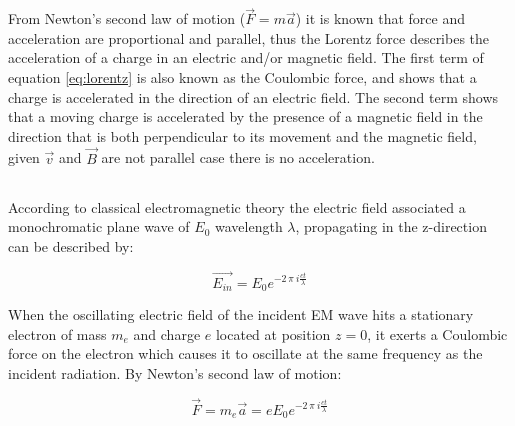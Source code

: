 \DIFaddbegin {}\DIFaddend From Newton's second law of motion
($\vec{F} = m \vec{a}$) it is known that force and acceleration are
proportional and parallel, thus the Lorentz force describes the
acceleration of a charge in an electric and/or magnetic field. The
first term of equation \ref{eq:lorentz} is also known as the Coulombic
force, and shows that a charge is accelerated in the direction of an
electric field. The second term shows that a moving charge is
accelerated by the presence of a magnetic field in the direction that
is both perpendicular to its movement and the magnetic field, given
\DIFaddbegin {}\DIFaddend $\vec{v}$ and $\vec{B}$ are not parallel \DIFdelbegin {}\DIFdelend \DIFaddbegin {}\DIFaddend case there is
no acceleration\DIFdelbegin \DIFdel{)}\DIFdelend .

\DIFaddbegin \subsection{}
\DIFaddend According to classical electromagnetic theory the electric field
associated \DIFdelbegin {}\DIFdelend \DIFaddbegin {}\DIFaddend a monochromatic plane wave of \DIFdelbegin {}\DIFdelend \DIFaddbegin {}\DIFaddend $E_0$ \DIFdelbegin \DIFdel{, }\DIFdelend \DIFaddbegin {}\DIFaddend wavelength $\lambda$, propagating in the z-direction \DIFdelbegin {}\DIFdelend can be described
by:

\begin{equation}\label{eq:plane_wave}
\vec{E_{in}} = E_0 e^{-2\,\pi\ i \frac{ c t }{\lambda}}
\end{equation} 

When the oscillating electric field of the incident EM wave hits a
stationary electron of mass $m_e$ and charge $e$ \DIFdelbegin \DIFdel{(}\DIFdelend located at
position $z = 0$\DIFdelbegin \DIFdel{)}\DIFdelend , it exerts a Coulombic force on the electron which
causes it to oscillate at the same frequency as the incident
radiation. By Newton's second law of motion:

\begin{equation}\label{eq:motion_single}
\vec{F} = m_e \vec{a} = e E_0 e^{-2\,\pi\ i \frac{ c t}{\lambda}} 
\end{equation}

